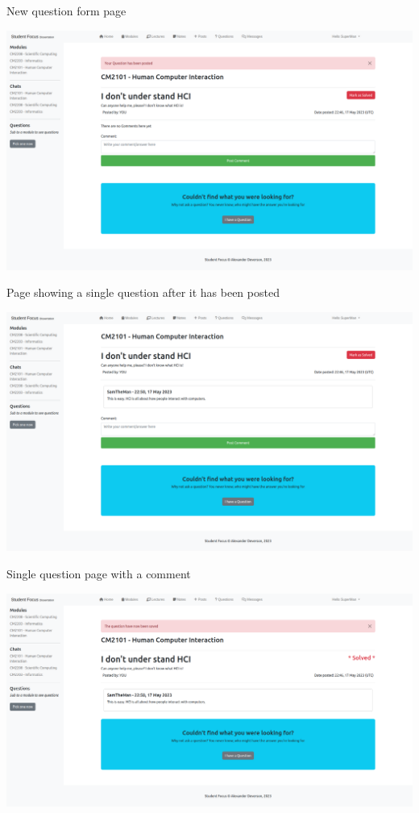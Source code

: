 New question form page

\includegraphics[scale=0.20]{images/application/10 - question posted.png}

Page showing a single question after it has been posted

\includegraphics[scale=0.20]{images/application/11 - question_comment.png}

Single question page with a comment

\includegraphics[scale=0.20]{images/application/12 - question_solved.png}

